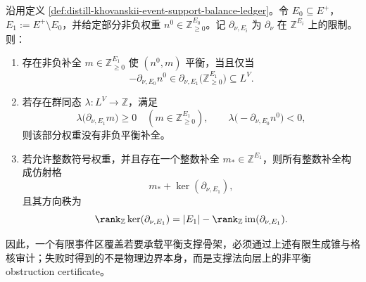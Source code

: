 \begin{proposition}[有限支撑平衡的扩张与秩障碍]\label{prop:distill-khovanskii-event-support-balance-extension}
沿用定义 \ref{def:distill-khovanskii-event-support-balance-ledger}。令 \(E_0\subseteq E^+\)，\(E_1:=E^+\setminus E_0\)，并给定部分非负权重 \(n^0\in\mathbb Z_{\ge0}^{E_0}\)。记 \(\partial_{\nu,E_i}\) 为 \(\partial_\nu\) 在 \(\mathbb Z^{E_i}\) 上的限制。则：
\begin{enumerate}
  \item 存在非负补全 \(m\in\mathbb Z_{\ge0}^{E_1}\) 使 \((n^0,m)\) 平衡，当且仅当
  \[
  -\partial_{\nu,E_0}n^0\in
  \partial_{\nu,E_1}\bigl(\mathbb Z_{\ge0}^{E_1}\bigr)\subseteq L^V.
  \]
  \item 若存在群同态 \(\lambda:L^V\to\mathbb Z\)，满足
  \[
  \lambda\bigl(\partial_{\nu,E_1}m\bigr)\ge0
  \quad(m\in\mathbb Z_{\ge0}^{E_1}),
  \qquad
  \lambda\bigl(-\partial_{\nu,E_0}n^0\bigr)<0,
  \]
  则该部分权重没有非负平衡补全。
  \item 若允许整数符号权重，并且存在一个整数补全 \(m_\ast\in\mathbb Z^{E_1}\)，则所有整数补全构成仿射格
  \[
  m_\ast+\ker(\partial_{\nu,E_1}),
  \]
  且其方向秩为
  \[
  \rank_{\mathbb Z}\ker(\partial_{\nu,E_1})
  =|E_1|-\rank_{\mathbb Z}\operatorname{im}(\partial_{\nu,E_1}).
  \]
\end{enumerate}
因此，一个有限事件区覆盖若要承载平衡支撑骨架，必须通过上述有限生成锥与格核审计；失败时得到的不是物理边界本身，而是支撑法向层上的非平衡 obstruction certificate。
\end{proposition}
